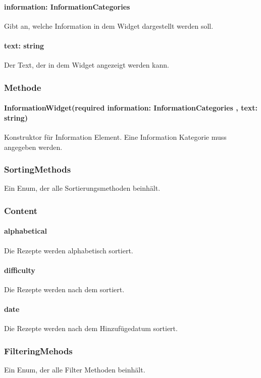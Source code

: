 \documentclass[parskip=full]{scrartcl}
\begin{document}
            \paragraph*{information: InformationCategories} Gibt an, welche Information in dem Widget dargestellt werden soll.
            \paragraph*{text: string} Der Text, der in dem Widget angezeigt werden kann.

        \subsubsection*{Methode}
            \paragraph*{InformationWidget(required information: InformationCategories , text: string)} Konstruktor für Information Element. Eine Information Kategorie muss angegeben werden.


    \subsubsection{SortingMethods}
        Ein Enum, der alle Sortierungsmethoden beinhält.
        \subsubsection*{Content}
            \paragraph*{alphabetical} Die Rezepte werden alphabetisch sortiert.
            \paragraph*{difficulty} Die Rezepte werden nach dem  sortiert.
            \paragraph*{date} Die Rezepte werden nach dem Hinzufügedatum sortiert.

    \subsubsection{FilteringMehods}
        Ein Enum, der alle Filter Methoden beinhält.
\end{document}
